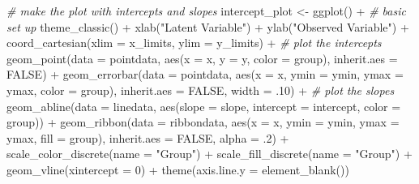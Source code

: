 \documentclass[
  man]{apa7}
\newenvironment{Shaded}{\begin{snugshade}}{\end{snugshade}}
\newcommand{\AttributeTok}[1]{\textcolor[rgb]{0.77,0.63,0.00}{#1}}
\newcommand{\CommentTok}[1]{\textcolor[rgb]{0.56,0.35,0.01}{\textit{#1}}}
\newcommand{\ConstantTok}[1]{\textcolor[rgb]{0.00,0.00,0.00}{#1}}
\newcommand{\DecValTok}[1]{\textcolor[rgb]{0.00,0.00,0.81}{#1}}
\newcommand{\FunctionTok}[1]{\textcolor[rgb]{0.00,0.00,0.00}{#1}}
\newcommand{\NormalTok}[1]{#1}
\newcommand{\OtherTok}[1]{\textcolor[rgb]{0.56,0.35,0.01}{#1}}
\newcommand{\SpecialCharTok}[1]{\textcolor[rgb]{0.00,0.00,0.00}{#1}}
\newcommand{\StringTok}[1]{\textcolor[rgb]{0.31,0.60,0.02}{#1}}
\begin{document}
\begin{Shaded}
\begin{Highlighting}[]
  \CommentTok{\# make the plot with intercepts and slopes}
\NormalTok{  intercept\_plot }\OtherTok{\textless{}{-}} 
  \FunctionTok{ggplot}\NormalTok{() }\SpecialCharTok{+} 
  \CommentTok{\# basic set up}
  \FunctionTok{theme\_classic}\NormalTok{() }\SpecialCharTok{+} 
  \FunctionTok{xlab}\NormalTok{(}\StringTok{"Latent Variable"}\NormalTok{) }\SpecialCharTok{+} 
  \FunctionTok{ylab}\NormalTok{(}\StringTok{"Observed Variable"}\NormalTok{) }\SpecialCharTok{+} 
  \FunctionTok{coord\_cartesian}\NormalTok{(}\AttributeTok{xlim =}\NormalTok{ x\_limits, }\AttributeTok{ylim =}\NormalTok{ y\_limits) }\SpecialCharTok{+} 
  \CommentTok{\# plot the intercepts }
  \FunctionTok{geom\_point}\NormalTok{(}\AttributeTok{data =}\NormalTok{ pointdata, }
             \FunctionTok{aes}\NormalTok{(}\AttributeTok{x =}\NormalTok{ x, }\AttributeTok{y =}\NormalTok{ y, }\AttributeTok{color =}\NormalTok{ group), }
             \AttributeTok{inherit.aes =} \ConstantTok{FALSE}\NormalTok{) }\SpecialCharTok{+} 
  \FunctionTok{geom\_errorbar}\NormalTok{(}\AttributeTok{data =}\NormalTok{ pointdata,}
                \FunctionTok{aes}\NormalTok{(}\AttributeTok{x =}\NormalTok{ x, }\AttributeTok{ymin =}\NormalTok{ ymin, }\AttributeTok{ymax =}\NormalTok{ ymax, }\AttributeTok{color =}\NormalTok{ group), }
                \AttributeTok{inherit.aes =} \ConstantTok{FALSE}\NormalTok{, }\AttributeTok{width =}\NormalTok{ .}\DecValTok{10}\NormalTok{) }\SpecialCharTok{+} 
  \CommentTok{\# plot the slopes}
  \FunctionTok{geom\_abline}\NormalTok{(}\AttributeTok{data =}\NormalTok{ linedata,}
              \FunctionTok{aes}\NormalTok{(}\AttributeTok{slope =}\NormalTok{ slope, }\AttributeTok{intercept =}\NormalTok{ intercept, }\AttributeTok{color =}\NormalTok{ group)) }\SpecialCharTok{+} 
  \FunctionTok{geom\_ribbon}\NormalTok{(}\AttributeTok{data =}\NormalTok{ ribbondata, }
              \FunctionTok{aes}\NormalTok{(}\AttributeTok{x =}\NormalTok{ x, }\AttributeTok{ymin =}\NormalTok{ ymin, }\AttributeTok{ymax =}\NormalTok{ ymax, }\AttributeTok{fill =}\NormalTok{ group), }
              \AttributeTok{inherit.aes =} \ConstantTok{FALSE}\NormalTok{, }\AttributeTok{alpha =}\NormalTok{ .}\DecValTok{2}\NormalTok{) }\SpecialCharTok{+} 
  \FunctionTok{scale\_color\_discrete}\NormalTok{(}\AttributeTok{name =} \StringTok{"Group"}\NormalTok{) }\SpecialCharTok{+} 
  \FunctionTok{scale\_fill\_discrete}\NormalTok{(}\AttributeTok{name =} \StringTok{"Group"}\NormalTok{) }\SpecialCharTok{+} 
  \FunctionTok{geom\_vline}\NormalTok{(}\AttributeTok{xintercept =} \DecValTok{0}\NormalTok{) }\SpecialCharTok{+} 
  \FunctionTok{theme}\NormalTok{(}\AttributeTok{axis.line.y =} \FunctionTok{element\_blank}\NormalTok{())}
  

\end{Highlighting}
\end{Shaded}
\end{document}
